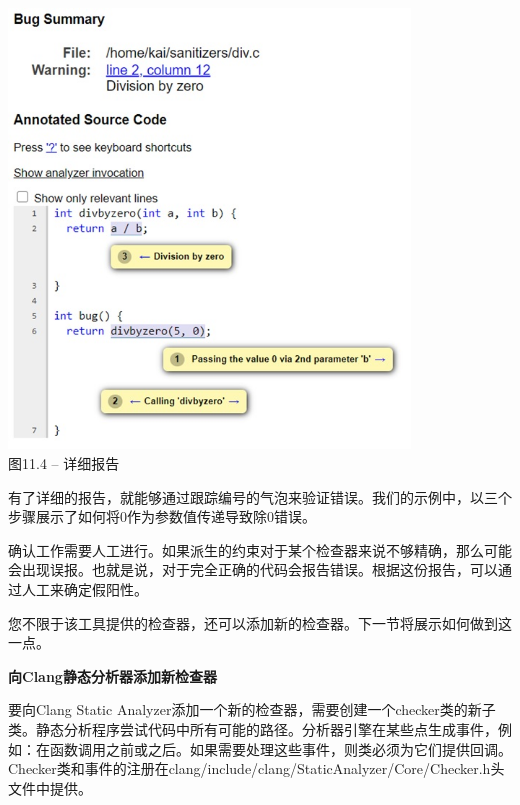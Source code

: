 \hspace*{\fill} \par %
\begin{center}
\includegraphics[width=0.8\textwidth]{content/3/chapter11/images/4.jpg}\\
图11.4 – 详细报告
\end{center}

有了详细的报告，就能够通过跟踪编号的气泡来验证错误。我们的示例中，以三个步骤展示了如何将0作为参数值传递导致除0错误。\par
 
确认工作需要人工进行。如果派生的约束对于某个检查器来说不够精确，那么可能会出现误报。也就是说，对于完全正确的代码会报告错误。根据这份报告，可以通过人工来确定假阳性。\par

您不限于该工具提供的检查器，还可以添加新的检查器。下一节将展示如何做到这一点。\par


\hspace*{\fill} \par %
\textbf{向Clang静态分析器添加新检查器}

要向Clang Static Analyzer添加一个新的检查器，需要创建一个checker类的新子类。静态分析程序尝试代码中所有可能的路径。分析器引擎在某些点生成事件，例如：在函数调用之前或之后。如果需要处理这些事件，则类必须为它们提供回调。Checker类和事件的注册在clang/include/clang/Stat\allowbreak icAnalyzer/Core/Checker.h头文件中提供。\par

